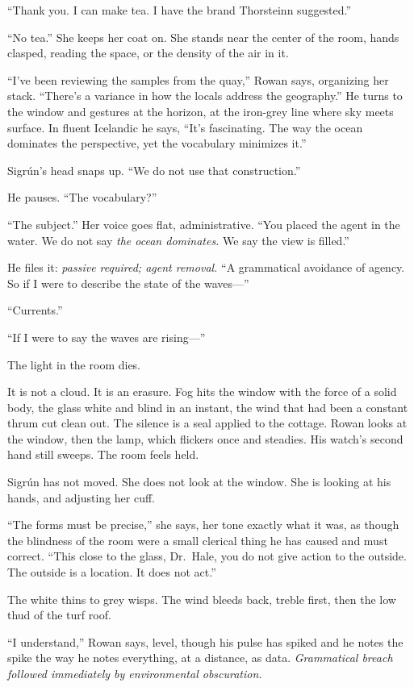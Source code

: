 \documentclass[11pt,oneside]{book}
\begin{document}
``Thank you. I can make tea. I have the brand Thorsteinn suggested.''

``No tea.'' She keeps her coat on. She stands near the center of the
room, hands clasped, reading the space, or the density of the air in it.

``I've been reviewing the samples from the quay,'' Rowan says,
organizing her stack. ``There's a variance in how the locals address the
geography.'' He turns to the window and gestures at the horizon, at the
iron-grey line where sky meets surface. In fluent Icelandic he says,
``It's fascinating. The way the ocean dominates the perspective, yet the
vocabulary minimizes it.''

Sigrún's head snaps up. ``We do not use that construction.''

He pauses. ``The vocabulary?''

``The subject.'' Her voice goes flat, administrative. ``You placed the
agent in the water. We do not say \emph{the ocean dominates.} We say the
view is filled.''

He files it: \emph{passive required; agent removal.} ``A grammatical
avoidance of agency. So if I were to describe the state of the
waves---''

``Currents.''

``If I were to say the waves are rising---''

The light in the room dies.

It is not a cloud. It is an erasure. Fog hits the window with the force
of a solid body, the glass white and blind in an instant, the wind that
had been a constant thrum cut clean out. The silence is a seal applied
to the cottage. Rowan looks at the window, then the lamp, which flickers
once and steadies. His watch's second hand still sweeps. The room feels
held.

Sigrún has not moved. She does not look at the window. She is looking at
his hands, and adjusting her cuff.

``The forms must be precise,'' she says, her tone exactly what it was,
as though the blindness of the room were a small clerical thing he has
caused and must correct. ``This close to the glass, Dr.~Hale, you do not
give action to the outside. The outside is a location. It does not
act.''

The white thins to grey wisps. The wind bleeds back, treble first, then
the low thud of the turf roof.

``I understand,'' Rowan says, level, though his pulse has spiked and he
notes the spike the way he notes everything, at a distance, as data.
\emph{Grammatical breach followed immediately by environmental
obscuration.}
\end{document}
